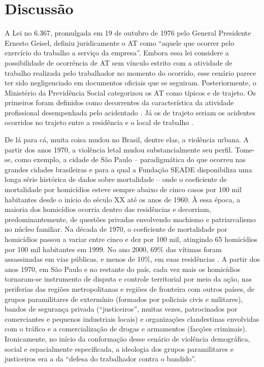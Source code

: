 \section{Discussão}

A Lei no 6.367, promulgada em 19 de outubro de 1976 pelo General Presidente Ernesto Geisel, definiu juridicamente o AT como “aquele que ocorrer pelo exercício do trabalho a serviço da empresa”\citep{lei636776}. Embora essa lei considere a possibilidade de ocorrência de AT sem vínculo estrito com a atividade de trabalho realizada pelo trabalhador no momento do ocorrido, esse cenário parece ter sido negligenciado em documentos oficiais que se seguiram. Posteriormente, o Ministério da Previdência Social categorizou os AT como típicos e de trajeto. Os primeiros foram definidos como decorrentes da característica da atividade profissional desempenhada pelo acidentado \citep{MPAS2006anuario}. Já os de trajeto seriam os acidentes ocorridos no trajeto entre a residência e o local de trabalho \citep{MPAS2006anuario}.

De lá para cá, muita coisa mudou no Brasil, dentre elas, a violência urbana. A partir dos anos 1970, a violência letal mudou substancialmente seu perfil. Tome-se, como exemplo, a cidade de São Paulo – paradigmática do que ocorreu nas grandes cidades brasileiras e para a qual a Fundação SEADE \citep{SEADE2017estat} disponibiliza uma longa série histórica de dados sobre mortalidade – onde o coeficiente de mortalidade por homicídios esteve sempre abaixo de cinco casos por 100 mil habitantes desde o início do século XX até os anos de 1960. À essa época, a maioria dos homicídios ocorria dentro das residências e decorriam, predominantemente, de questões privadas envolvendo machismo e patriarcalismo no núcleo familiar. Na década de 1970, o coeficiente de mortalidade por homicídios passou a variar entre cinco e dez por 100 mil, atingindo 65 homicídios por 100 mil habitantes em 1999. No ano 2000, 69\% das vítimas foram assassinadas em vias públicas, e menos de 10\%, em suas residências \citep{gawryszewski2000mortalidade, gawryszewski2002homicidios}. A partir dos anos 1970, em São Paulo e no restante do país, cada vez mais os homicídios tornaram-se instrumento de disputa e controle territorial por meio da ação, nas periferias das regiões metropolitanas e regiões de fronteira com outros países, de grupos paramilitares de extermínio (formados por policiais civis e militares), bandos de segurança privada (“justiceiros”, muitas vezes, patrocinados por comerciantes e pequenos industriais locais) e organizações clandestinas envolvidas com o tráfico e a comercialização de drogas e armamentos (facções criminais). Ironicamente, no início da conformação desse cenário de violência demográfica, social e espacialmente especificada, a ideologia dos grupos paramilitares e justiceiros era a da “defesa do trabalhador contra o bandido”.

